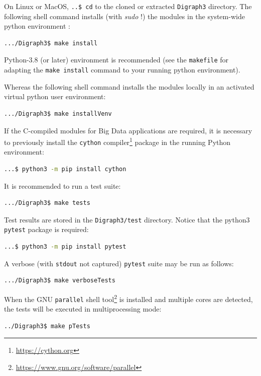 On Linux or MacOS, \texttt{..\$ cd} to the cloned or extracted \texttt{Digraph3} directory. The following shell command installs (with \emph{sudo} !) the \Digraph modules in the system-wide python environment :
\begin{lstlisting}[language=sh, backgroundcolor=\color{White},numbers=none]
  .../Digraph3$ make install
\end{lstlisting}

Python-3.8 (or later) environment is recommended (see the \texttt{makefile} for adapting the \texttt{make install} command to your running python environment).

Whereas the following shell command installs the \Digraph modules locally in an activated virtual python user environment:
\begin{lstlisting}[language=sh, backgroundcolor=\color{White}, numbers=none]
  .../Digraph3$ make installVenv
\end{lstlisting}

If the C-compiled modules for Big Data applications are required, it is necessary to previously install the \texttt{cython} compiler\footnote{\href{https://cython.org}{https://cython.org}} package in the running Python environment:
\begin{lstlisting}[language=sh, backgroundcolor=\color{White}, numbers=none]
  ...$ python3 -m pip install cython
\end{lstlisting}

It is recommended to run a test suite:
\begin{lstlisting}[language=sh, backgroundcolor=\color{White}, numbers=none]
  .../Digraph3$ make tests
\end{lstlisting}

Test results are stored in the \texttt{Digraph3/test} directory. Notice that the python3 \texttt{pytest} package is required:
\begin{lstlisting}[language=sh, backgroundcolor=\color{White}, numbers=none]
  ...$ python3 -m pip install pytest
\end{lstlisting}

A verbose (with \texttt{stdout} not captured) \texttt{pytest} suite may be run as follows:
\begin{lstlisting}[language=sh, backgroundcolor=\color{White}, numbers=none]
  .../Digraph3$ make verboseTests
\end{lstlisting}

When the GNU \texttt{parallel} shell tool\footnote{\href{https://www.gnu.org/software/parallel}{https://www.gnu.org/software/parallel}} is installed and multiple cores are detected, the tests will be executed in multiprocessing mode:
\begin{lstlisting}[language=sh, backgroundcolor=\color{White}, numbers=none]
  ../Digraph3$ make pTests
\end{lstlisting}

